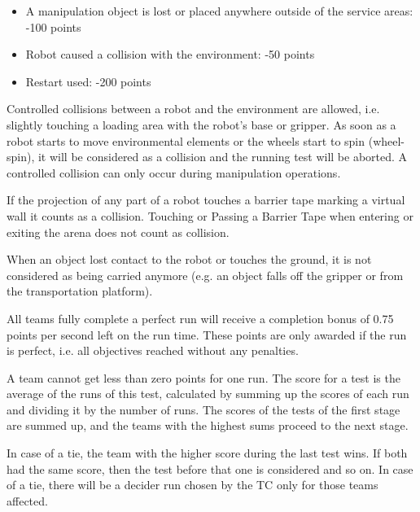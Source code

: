 \begin{itemize}
	\item A manipulation object is lost or placed anywhere outside of the service areas: \hfill -100 points
	\item Robot caused a collision with the environment: \hfill -50 points
	\item Restart used: \hfill -200 points
\end{itemize}

Controlled collisions between a robot and the environment are allowed, i.e. slightly touching a loading area with the robot’s base or gripper. As soon as a robot starts to move environmental elements or the wheels start to spin (wheel-spin), it will be considered as a collision and the running test will be aborted. A controlled collision can only occur during manipulation operations.
\par
If the projection of any part of a robot touches a barrier tape marking a virtual wall it counts as a collision. Touching or Passing a Barrier Tape when entering or exiting the arena does not count as collision.
\par
When an object lost contact to the robot or touches the ground, it is not considered as being carried anymore (e.g. an object falls off the gripper or from the transportation platform).
\par
All teams fully complete a perfect run will receive a completion bonus of 0.75 points per second left on the run time. These points are only awarded if the run is perfect, i.e. all objectives reached without any penalties.
\par
A team cannot get less than zero points for one run. The score for a test is the average of the runs of this test, calculated by summing up the scores of each run and dividing it by the number of runs. The scores of the tests of the first stage are summed up, and the teams with the highest sums proceed to the next stage.
\par
In case of a tie, the team with the higher score during the last test wins. If both had the same score, then the test before that one is considered and so on. In case of a tie, there will be a decider run chosen by the TC only for those teams affected.
\par
\par

